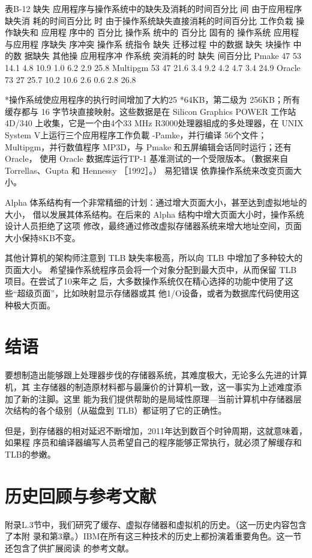 表B-12
缺失
应用程序与操作系统中的缺失及消耗的时间百分比
间
由于应用程序缺失消
耗的时间百分比
时
由于操作系统缺失直接消耗的时间百分比
工作负栽
操作缺失和
应用程
序中的
百分比
操作系
统中的
百分比
固有的
操作系统
应用程
与应用程
序缺失
序冲突
操作系
统指令
缺失
迁移过程
中的数据
缺失
块操怍
中的数
据缺失
其他操
应用程序冲
作系统
突消耗的时
缺失
间百分比
Pmake
47%
53%
14.1%
4.8%
10.9%
1.0%
6.2%
2.9%
25.8%
Multipgm
53%
47%
21.6%
3.4%
9.2%
4.2%
4.7%
3.4%
24.9%
Oracle
73%
27%
25.7%
10.2%
10.6%
2.6%
0.6%
2.8%
26.8%

*操作系绒使应用程序的执行时间增加了大約25%
*64KB，第二级为 256KB；所有缓存都与 16 字节块直接映射。这些数据是在 Silicon Graphics POWER 工作站 4D/340
上收集，它是一个由4个33 MHz R3000处理器組成的多处理器，在 UNIX System V上运行三个应用程序工作负載
-Pamke，并行编译 56个文件；Multipgm，并行数值程序 MP3D，与 Pmake 和五屏编辑会话同时运行；还有 Oracle，
使用 Oracle 数据库运行TP-1 基准测试的一个受限版本。（數据来自 Torrellas、Gupta 和 Hennessy ［1992］。）
易犯错误 依靠操作系统来改变页面大小。

Alpha 体系结构有一个非常精细的计划：通过增大页面大小，甚至达到虚拟地址的大小，
借以发展其体系结构。在后来的 Alpha 结构中增大页面大小时，操作系统设计人员拒绝了这项
修改，最终通过修改虚拟存储器系统来增大地址空间，页面大小保持8KB不变。

其他计算机的架构师注意到 TLB 缺失率极高，所以向 TLB 中增加了多种较大的页面大小。
希望操作系统程序员会将一个对象分配到最大页中，从而保留 TLB 项目。在尝试了10来年之
后，大多数操作系统仅在精心选择的功能中使用了这些“超级页面”，比如映射显示存储器或其
他1/O设备，或者为数据库代码使用这种极大页面。

\section{结语}

要想制造出能够跟上处理器步伐的存储器系统，其难度极大，无论多么先进的计算机，其
主存储器的制造原材料都与最廉价的计算机一致，这一事实为上述难度添加了新的注脚。这里
能为我们提供帮助的是局域性原理—当前计算机中存储器层次结构的各个级别（从磁盘到
TLB）都证明了它的正确性。

但是，到存储器的相对延迟不断增加，2011年达到数百个时钟周期，这就意味着，如果程
序员和编译器编写人员希望自己的程序能够正常执行，就必须了解缓存和TLB的参嫩。

\section{历史回顾与参考文献}
附录L.3节中，我们研究了缓存、虚拟存储器和虚拟机的历史。（这一历史内容包含了本附
录和第3章。）IBM在所有这三种技术的历史上都扮演着重要角色。这一节还包含了供扩展阅读
的参考文献。

